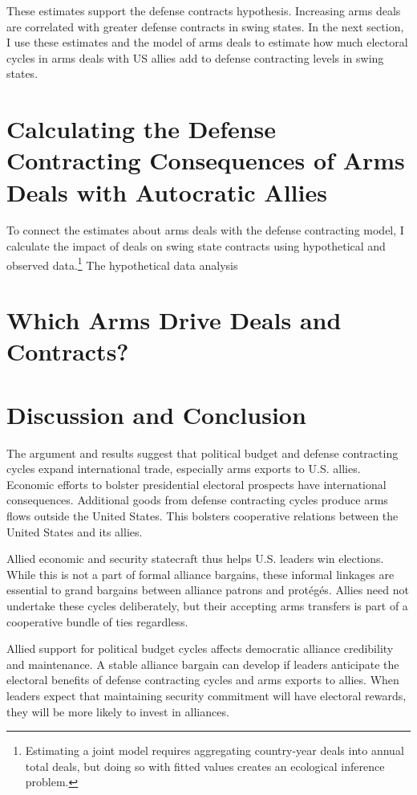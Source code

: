 \documentclass[12pt]{article}
\begin{document}
These estimates support the defense contracts hypothesis. 
Increasing arms deals are correlated with greater defense contracts in swing states. 
In the next section, I use these estimates and the model of arms deals to estimate how much electoral cycles in arms deals with US allies add to defense contracting levels in swing states.  


\section{Calculating the Defense Contracting Consequences of Arms Deals with Autocratic Allies}


To connect the estimates about arms deals with the defense contracting model, I calculate the impact of deals on swing state contracts using hypothetical and observed data.\footnote{Estimating a joint model requires aggregating country-year deals into annual total deals, but doing so with fitted values creates an ecological inference problem.}
The hypothetical data analysis 


\section{Which Arms Drive Deals and Contracts?} 



\section{Discussion and Conclusion}


The argument and results suggest that political budget and defense contracting cycles expand international trade, especially arms exports to U.S. allies. 
Economic efforts to bolster presidential electoral prospects have international consequences. 
Additional goods from defense contracting cycles produce arms flows outside the United States.
This bolsters cooperative relations between the United States and its allies.


Allied economic and security statecraft thus helps U.S. leaders win elections. 
While this is not a part of formal alliance bargains, these informal linkages are essential to grand bargains between alliance patrons and prot{\'e}g{\'e}s.
Allies need not undertake these cycles deliberately, but their accepting arms transfers is part of a cooperative bundle of ties regardless.


Allied support for political budget cycles affects democratic alliance credibility and maintenance. 
A stable alliance bargain can develop if leaders anticipate the electoral benefits of defense contracting cycles and arms exports to allies.
When leaders expect that maintaining security commitment will have electoral rewards, they will be more likely to invest in alliances. 
\end{document}
